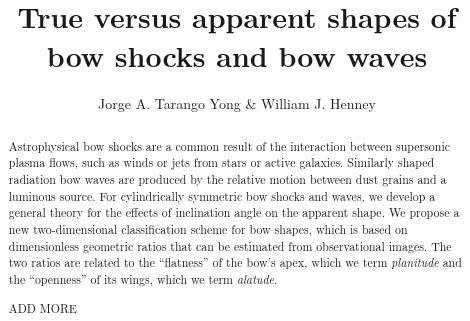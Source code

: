 \documentclass[useAMS, usenatbib, a4paper]{mnras}
\title[Bow shock shapes]{True versus apparent shapes of bow shocks and bow waves}
\author[Tarango Yong \& Henney]{
  Jorge A. Tarango Yong \& William J. Henney\\
  \AddressCRyA
}
\begin{document}
\maketitle
\begin{abstract}
  Astrophysical bow shocks are a common result of the interaction
  between supersonic plasma flows, such as winds or jets from stars or
  active galaxies.  Similarly shaped radiation bow waves are produced
  by the relative motion between dust grains and a luminous source.
  For cylindrically symmetric bow shocks and waves, we develop a
  general theory for the effects of inclination angle on the apparent
  shape. We propose a new two-dimensional classification scheme for
  bow shapes, which is based on dimensionless geometric ratios that
  can be estimated from observational images.  The two ratios are
  related to the ``flatness'' of the bow's apex, which we term
  \textit{planitude} and the ``openness'' of its wings, which we term
  \textit{alatude}.

  ADD MORE
\end{abstract}






\clearpage

\clearpage


\clearpage


\appendix




\end{document}
